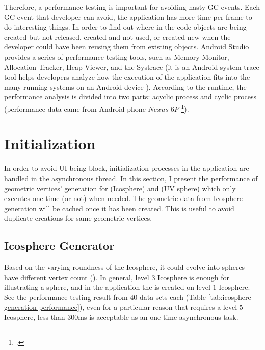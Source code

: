 Therefore, a performance testing is important for avoiding nasty GC events. Each GC event that developer can avoid, the application has more time per frame to do interesting things. In order to find out where in the code objects are being created but not released, created and not used, or created new when the developer could have been reusing them from existing objects. Android Studio provides a series of performance testing tools, such as Memory Monitor, Allocation Tracker, Heap Viewer, and the Systrace (it is an Android system trace tool helps developers analyze how the execution of the application fits into the many running systems on an Android device \cite{google.systrace.2016}). According to the runtime, the performance analysis is divided into two parts: acyclic process and cyclic process (performance data came from Android phone $Nexus\;6P$ \footcite{CPU: 2.0GHz octa-core, 64-bit ARM Cortex-A57 & ARM Cortex-A53, 8 cores; GPU: Adreno 430}).

\section{Initialization}

In order to avoid UI being block, initialization processes in the application are handled in the asynchronous thread. In this section, I present the performance of geometric vertices' generation for  (Icosphere) and  (UV sphere) which only executes one time (or not) when needed. The geometric data from Icosphere generation will be cached once it has been created. This is useful to avoid duplicate creations for same geometric vertices.

\subsection{Icosphere Generator}

Based on the varying roundness of the Icosphere, it could evolve into spheres have different vertex count (). In general, level $3$ Icosphere is enough for illustrating a sphere, and in the application the  is created on level $1$ Icosphere. See the performance testing result from $40$ data sets each (Table \ref{tab:icosphere-generation-performance}), even for a particular reason that requires a level $5$ Icosphere, less than $300$ms is acceptable as an one time asynchronous task.

